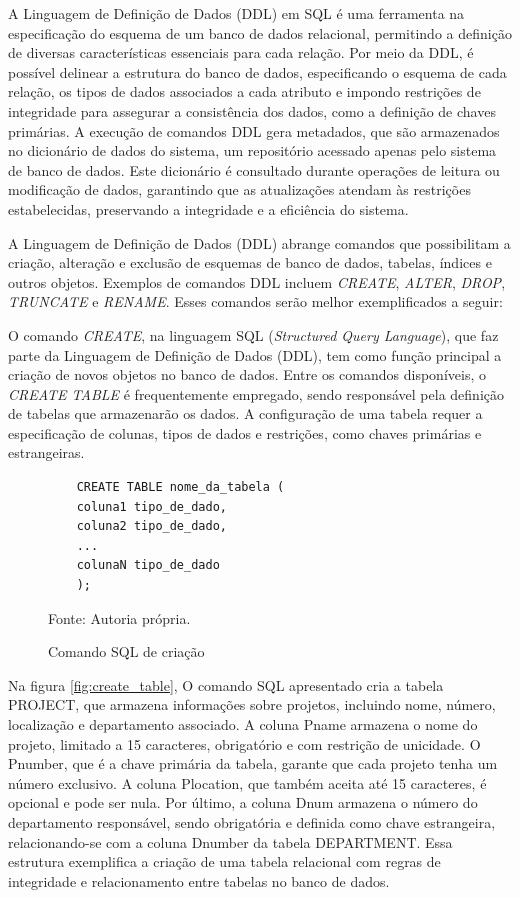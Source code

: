 A Linguagem de Definição de Dados (DDL) em SQL é uma ferramenta na especificação do esquema de um banco de dados relacional, permitindo a definição de diversas características essenciais para cada relação. Por meio da DDL, é possível delinear a estrutura do banco de dados, especificando o esquema de cada relação, os tipos de dados associados a cada atributo e impondo restrições de integridade para assegurar a consistência dos dados, como a definição de chaves primárias. A execução de comandos DDL gera metadados, que são armazenados no dicionário de dados do sistema, um repositório acessado apenas pelo sistema de banco de dados. Este dicionário é consultado durante operações de leitura ou modificação de dados, garantindo que as atualizações atendam às restrições estabelecidas, preservando a integridade e a eficiência do sistema.\cite{silberschatz2011database}

A Linguagem de Definição de Dados (DDL) abrange comandos que possibilitam a criação, alteração e exclusão de esquemas de banco de dados, tabelas, índices e outros objetos. Exemplos de comandos DDL incluem \textit{CREATE}, \textit{ALTER}, \textit{DROP}, \textit{TRUNCATE} e \textit{RENAME}. Esses comandos serão melhor exemplificados a seguir:


O comando \textit{CREATE}, na linguagem SQL (\textit{Structured Query Language}), que faz parte da Linguagem de Definição de Dados (DDL), tem como função principal a criação de novos objetos no banco de dados. Entre os comandos disponíveis, o \textit{CREATE TABLE} é frequentemente empregado, sendo responsável pela definição de tabelas que armazenarão os dados. A configuração de uma tabela requer a especificação de colunas, tipos de dados e restrições, como chaves primárias e estrangeiras\cite{silberschatz2011database}.

\begin{figure}[H]
    \centering
    \begin{lstlisting}
    CREATE TABLE nome_da_tabela (
    coluna1 tipo_de_dado,
    coluna2 tipo_de_dado,
    ...
    colunaN tipo_de_dado
    );
        \end{lstlisting}
    \caption{Comando SQL de criação}
    Fonte: Autoria própria.
    \label{lst:sql_create}
\end{figure}


Na figura \ref{fig:create_table}, O comando SQL apresentado cria a tabela PROJECT, que armazena informações sobre projetos, incluindo nome, número, localização e departamento associado. A coluna Pname armazena o nome do projeto, limitado a 15 caracteres, obrigatório e com restrição de unicidade. O Pnumber, que é a chave primária da tabela, garante que cada projeto tenha um número exclusivo. A coluna Plocation, que também aceita até 15 caracteres, é opcional e pode ser nula. Por último, a coluna Dnum armazena o número do departamento responsável, sendo obrigatória e definida como chave estrangeira, relacionando-se com a coluna Dnumber da tabela DEPARTMENT. Essa estrutura exemplifica a criação de uma tabela relacional com regras de integridade e relacionamento entre tabelas no banco de dados.

